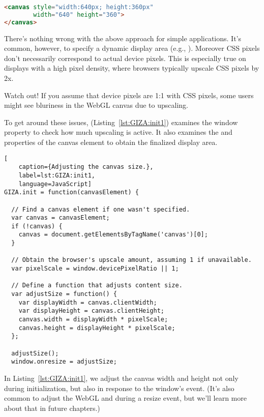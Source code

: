 \begin{lstlisting}[language=HTML]
<canvas style="width:640px; height:360px"
        width="640" height="360">
</canvas>
\end{lstlisting}

There's nothing wrong with the above approach for simple applications.  It's common, however, to specify a dynamic display area (e.g., ).  Moreover CSS pixels don't necessarily correspond to actual device pixels.  This is especially true on displays with a high pixel density, where browsers typically upscale CSS pixels by 2x.

\begin{sidenote}%
Watch out!  If you assume that device pixels are 1:1 with CSS pixels, some users might see bluriness in the WebGL canvas due to upscaling.
\end{sidenote}

To get around these issues,  (Listing~\ref{lst:GIZA:init1}) examines the \linebreak {} window property to check how much upscaling is active.  It also examines the   and  properties of the canvas element to obtain the finalized display area.

\begin{lstlisting}[
    caption={Adjusting the canvas size.},
    label=lst:GIZA:init1,
    language=JavaScript]
GIZA.init = function(canvasElement) {

  // Find a canvas element if one wasn't specified.
  var canvas = canvasElement;
  if (!canvas) {
    canvas = document.getElementsByTagName('canvas')[0];
  }

  // Obtain the browser's upscale amount, assuming 1 if unavailable.
  var pixelScale = window.devicePixelRatio || 1;

  // Define a function that adjusts content size.
  var adjustSize = function() {
    var displayWidth = canvas.clientWidth;
    var displayHeight = canvas.clientHeight;
    canvas.width = displayWidth * pixelScale;
    canvas.height = displayHeight * pixelScale;
  };

  adjustSize();
  window.onresize = adjustSize;
\end{lstlisting} 

In Listing~\ref{lst:GIZA:init1}, we adjust the canvas width and height not only during initialization, but also in response to the window's   event.  (It's also common to adjust the WebGL  and  during a resize event, but we'll learn more about that in future chapters.)

